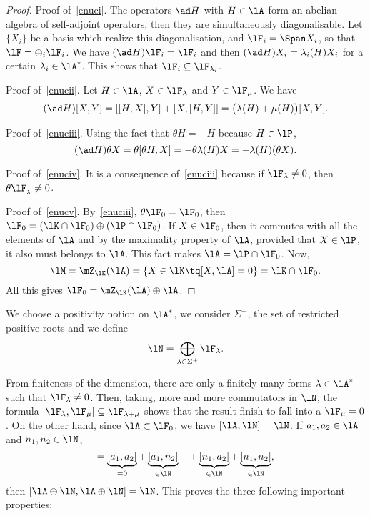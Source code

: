 \begin{proof}
Proof of~\ref{enuci}. The operators $\ad H$ with $H\in\lA$ form an abelian algebra of self-adjoint operators, then they are simultaneously diagonalisable. Let $\{X_i\}$ be a basis which realize this diagonalisation, and $\lF_i=\Span X_i$, so that $\lF=\oplus_i\lF_i$. We have $(\ad H)\lF_i=\lF_i$ and then $(\ad H)X_i=\lambda_i(H)X_i$ for a certain $\lambda_i\in\lA^*$. This shows that $\lF_i\subseteq\lF_{\lambda_i}$.

Proof of~\ref{enucii}. Let $H\in\lA$, $X\in\lF_{\lambda}$ and $Y\in\lF_{\mu}$. We have
\begin{equation}
   (\ad H)[X,Y]=[[H,X],Y]+[X,[H,Y]]
               =\big(  \lambda(H)+\mu(H) \big) [X,Y].
\end{equation}

Proof of~\ref{enuciii}. Using the fact that $\theta H=-H$ because $H\in\lP$,
\begin{equation}
  (\ad H)\theta X=\theta[\theta H,X]
                 =-\theta\lambda(H)X
         =-\lambda(H)(\theta X).
\end{equation}

Proof of~\ref{enuciv}. It is a consequence of~\ref{enuciii} because if $\lF_{\lambda}\neq 0$, then $\theta\lF_{_{\lambda}}\neq 0$.

Proof of~\ref{enucv}. By~\ref{enuciii}, $\theta\lF_0=\lF_0$, then $\lF_0=(\lK\cap\lF_0)\oplus(\lP\cap\lF_0)$. If $X\in\lF_0$, then it commutes with all the elements of $\lA$ and by the maximality property of $\lA$, provided that $X\in\lP$, it also must belongs to $\lA$. This fact makes $\lA=\lP\cap\lF_0$. Now,
\[
  \lM=\mZ_{\lK}(\lA)=\{X\in\lK\tq [X,\lA]=0\}=\lK\cap\lF_0.
\]
All this gives $\lF_0=\mZ_{\lK}(\lA)\oplus\lA$.
\end{proof}

We choose a positivity notion on $\lA^*$, we consider $\Sigma^+$, the set of restricted positive roots and we define
\[
  \lN=\bigoplus_{\lambda\in\Sigma^+}\lF_{\lambda}.
\]

From finiteness of the dimension, there are only a finitely many forms $\lambda\in\lA^*$ such that $\lF_{\lambda}\neq 0$. Then, taking, more and more commutators in $\lN$, the formula $[\lF_{\lambda},\lF_{\mu}]\subseteq\lF_{\lambda+\mu}$ shows that the result finish to fall into a $\lF_{\mu}=0$. On the other hand, since $\lA\subset\lF_0$, we have $[\lA,\lN]=\lN$. If $a_1,a_2\in\lA$ and $n_1,n_2\in\lN$,
\begin{equation}
   [a_1+n_1,a_2+n_2]=\underbrace{[a_1,a_2]}_{=0}+\underbrace{[a_1,n_2]}_{\in\lN}
                      \quad+\underbrace{[n_1,a_2]}_{\in\lN}+\underbrace{[n_1,n_2]}_{\in\lN},
\end{equation}
then $[\lA\oplus\lN,\lA\oplus\lN]=\lN$. This proves the three following important properties:

